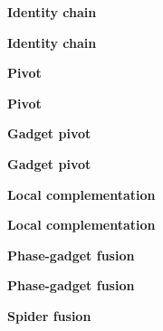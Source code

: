 \documentclass{article}
\begin{document}
\clearpage
\begin{center}
\textbf{Identity chain}\par\medskip

\end{center}
\clearpage
\begin{center}
\textbf{Identity chain}\par\medskip

\end{center}
\clearpage
\begin{center}
\textbf{Pivot}\par\medskip

\end{center}
\clearpage
\begin{center}
\textbf{Pivot}\par\medskip

\end{center}
\clearpage
\begin{center}
\textbf{Gadget pivot}\par\medskip

\end{center}
\clearpage
\begin{center}
\textbf{Gadget pivot}\par\medskip

\end{center}
\clearpage
\begin{center}
\textbf{Local complementation}\par\medskip

\end{center}
\clearpage
\begin{center}
\textbf{Local complementation}\par\medskip

\end{center}
\clearpage
\begin{center}
\textbf{Phase-gadget fusion}\par\medskip

\end{center}
\clearpage
\begin{center}
\textbf{Phase-gadget fusion}\par\medskip

\end{center}
\clearpage
\begin{center}
\textbf{Spider fusion}\par\medskip

\end{center}
\end{document}
